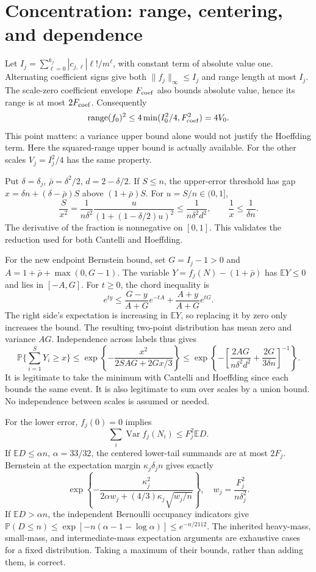\documentclass[10pt]{article}
\newcommand{\E}{\mathbb E}
\newcommand{\Prb}{\mathbb P}
\newcommand{\Var}{\operatorname{Var}}
\begin{document}
\section{Concentration: range, centering, and dependence}
Let $I_j=\sum_{\ell=0}^{k_j}|c_{j,\ell}|\ell!/m^\ell$, with constant
term of absolute value one. Alternating coefficient signs give both
$\|f_j\|_\infty\le I_j$ and range length at most $I_j$.
The scale-zero coefficient envelope $F_{\rm coef}$ also bounds absolute
value, hence its range is at most $2F_{\rm coef}$. Consequently
\[
\operatorname{range}(f_0)^2\le
4\min(I_0^2/4,F_{\rm coef}^2)=4V_0.
\]
This point matters: a variance upper bound alone would not justify the
Hoeffding term. Here the squared-range upper bound is actually available.
For the other scales $V_j=I_j^2/4$ has the same property.

Put $\delta=\delta_j$, $\bar\rho=\delta^2/2$, $d=2-\delta/2$.
If $S\le n$, the upper-error threshold has gap
$x=\delta n+(\delta-\bar\rho)S$ above $(1+\bar\rho)S$.
For $u=S/n\in(0,1]$,
\[
\frac{S}{x^2}=\frac{1}{n\delta^2}
\frac{u}{(1+(1-\delta/2)u)^2}
\le\frac{1}{n\delta^2d^2},\qquad
\frac1x\le\frac1{\delta n}.
\]
The derivative of the fraction is nonnegative on $[0,1]$.
This validates the reduction used for both Cantelli and Hoeffding.

For the new endpoint Bernstein bound, set $G=I_j-1>0$ and
$A=1+\bar\rho+\max(0,G-1)$. The variable
$Y=f_j(N)-(1+\bar\rho)$ has $\E Y\le0$ and lies in $[-A,G]$.
For $t\ge0$, the chord inequality is
\[
e^{ty}\le\frac{G-y}{A+G}e^{-tA}
             +\frac{A+y}{A+G}e^{tG}.
\]
The right side's expectation is increasing in $\E Y$, so replacing it
by zero only increases the bound. The resulting two-point distribution
has mean zero and variance $AG$. Independence across labels thus gives
\[
\Prb\{\textstyle\sum_{i=1}^S Y_i\ge x\}
\le \exp\left\{-\frac{x^2}{2SAG+2Gx/3}\right\}
\le \exp\left\{-\left[
\frac{2AG}{n\delta^2d^2}+\frac{2G}{3\delta n}\right]^{-1}\right\}.
\]
It is legitimate to take the minimum with Cantelli and Hoeffding since
each bounds the same event. It is also legitimate to sum over scales
by a union bound. No independence between scales is assumed or needed.

For the lower error, $f_j(0)=0$ implies
\[
\sum_i\Var f_j(N_i)\le F_j^2\E D.
\]
If $\E D\le\alpha n$, $\alpha=33/32$, the centered lower-tail summands
are at most $2F_j$. Bernstein at the expectation margin
$\kappa_j\delta_j n$ gives exactly
\[
\exp\left\{-\frac{\kappa_j^2}
 {2\alpha w_j+(4/3)\kappa_j\sqrt{w_j/n}}\right\},
\quad w_j=\frac{F_j^2}{n\delta_j^2}.
\]
If $\E D>\alpha n$, the independent Bernoulli occupancy indicators give
$\Prb(D\le n)\le\exp[-n(\alpha-1-\log\alpha)]\le e^{-n/2112}$.
The inherited heavy-mass, small-mass, and intermediate-mass expectation
arguments are exhaustive cases for a fixed distribution. Taking a maximum
of their bounds, rather than adding them, is correct.
\end{document}

